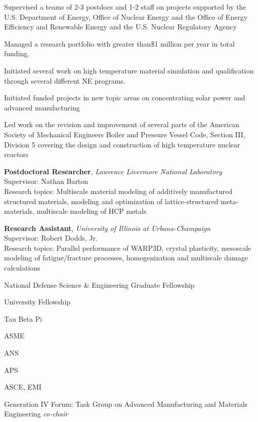 Supervised a teams of 2-3 postdocs and 1-2 staff on projects
supported by the U.S. Department of Energy, Office of Nuclear Energy and 
the Office of Energy Efficiency and Renewable Energy
and the U.S. Nuclear Regulatory Agency

Managed a research portfolio with greater than\$1 million per year in total funding.  

Initiated several work on high temperature material simulation and qualification through several different NE programs.

Initiated funded projects in new topic areas on concentrating solar power and advanced manufacturing

Led work on the revision and improvement of several parts of the American Society of 
Mechanical Engineers Boiler and Pressure Vessel Code, Section III, Division 5 covering the
design and construction of high temperature nuclear reactors

\textbf{Postdoctoral Researcher}, \emph{Lawrence Livermore National
Laboratory} \\
Supervisor: Nathan Barton \\
Research topics: Multiscale material modeling of additively manufactured
structured materials, modeling and optimization of lattice-structured
meta-materials, multiscale modeling of HCP metals

\textbf{Research Assistant}, \emph{University of Illinois at Urbana-Champaign}
\\
Supervisor: Robert Dodds, Jr. \\
Research topics: Parallel performance of WARP3D, crystal plasticity,
mesoscale modeling of fatigue/fracture processes, homogenization and
multiscale damage calculations


National Defense Science \& Engineering Graduate Fellowship 

University Fellowship 

Tau Beta Pi 


ASME 

ANS 

APS 

ASCE, EMI 


Generation IV Forum:  Task Group on Advanced Manufacturing and Materials Engineering \emph{co-chair} 


